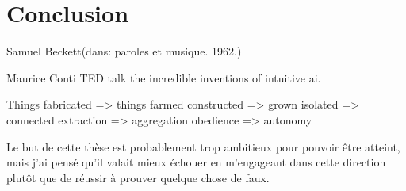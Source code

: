 %
\chapter{Conclusion}
\label{ch:conclusion}

{Samuel Beckett}{(dans: paroles et musique. 1962.)}

Maurice Conti
TED talk the incredible inventions of intuitive ai.

Things fabricated => things farmed
constructed => grown
isolated => connected
extraction => aggregation
obedience => autonomy


 Le but de cette thèse est probablement trop ambitieux pour pouvoir être atteint, mais j’ai pensé qu’il valait mieux échouer en m’engageant dans cette direction plutôt que de réussir à prouver quelque chose de faux.
